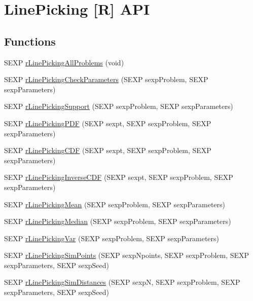 \hypertarget{group__rapi}{\section{Line\-Picking \mbox{[}R\mbox{]} A\-P\-I}
\label{group__rapi}
}
\subsection*{Functions}
\begin{DoxyCompactItemize}
\item 
S\-E\-X\-P \hyperlink{group__rapi_ga02145a395d24bbe929ffa57688c72ef5}{r\-Line\-Picking\-All\-Problems} (void)
\item 
S\-E\-X\-P \hyperlink{group__rapi_ga9b3ba58aca598b6ee8f7239e87f3076c}{r\-Line\-Picking\-Check\-Parameters} (S\-E\-X\-P sexp\-Problem, S\-E\-X\-P sexp\-Parameters)
\item 
S\-E\-X\-P \hyperlink{group__rapi_ga6b30fc1bdbca2a3cc7f5340f1d8b44d5}{r\-Line\-Picking\-Support} (S\-E\-X\-P sexp\-Problem, S\-E\-X\-P sexp\-Parameters)
\item 
S\-E\-X\-P \hyperlink{group__rapi_gafe4502dd2e61ac946bfe6543fb38dd39}{r\-Line\-Picking\-P\-D\-F} (S\-E\-X\-P sexpt, S\-E\-X\-P sexp\-Problem, S\-E\-X\-P sexp\-Parameters)
\item 
S\-E\-X\-P \hyperlink{group__rapi_gac85aaf9284a29359e0d534ac1641b3f2}{r\-Line\-Picking\-C\-D\-F} (S\-E\-X\-P sexpt, S\-E\-X\-P sexp\-Problem, S\-E\-X\-P sexp\-Parameters)
\item 
S\-E\-X\-P \hyperlink{group__rapi_ga853c8dab80e2bdd284dba4f5e957811a}{r\-Line\-Picking\-Inverse\-C\-D\-F} (S\-E\-X\-P sexpt, S\-E\-X\-P sexp\-Problem, S\-E\-X\-P sexp\-Parameters)
\item 
S\-E\-X\-P \hyperlink{group__rapi_ga4316d34063551a4121f4cc0b7959b166}{r\-Line\-Picking\-Mean} (S\-E\-X\-P sexp\-Problem, S\-E\-X\-P sexp\-Parameters)
\item 
S\-E\-X\-P \hyperlink{group__rapi_gab5df1a048f574d55cfa6d609fd33d436}{r\-Line\-Picking\-Median} (S\-E\-X\-P sexp\-Problem, S\-E\-X\-P sexp\-Parameters)
\item 
S\-E\-X\-P \hyperlink{group__rapi_gac2d2e36336e7c32427a9e99ccc67d18e}{r\-Line\-Picking\-Var} (S\-E\-X\-P sexp\-Problem, S\-E\-X\-P sexp\-Parameters)
\item 
S\-E\-X\-P \hyperlink{group__rapi_gacf32b79fce86f86cedc7843775e163c3}{r\-Line\-Picking\-Sim\-Points} (S\-E\-X\-P sexp\-Npoints, S\-E\-X\-P sexp\-Problem, S\-E\-X\-P sexp\-Parameters, S\-E\-X\-P sexp\-Seed)
\item 
S\-E\-X\-P \hyperlink{group__rapi_ga1d8792844b8fb2bfe583d80d7580938d}{r\-Line\-Picking\-Sim\-Distances} (S\-E\-X\-P sexp\-N, S\-E\-X\-P sexp\-Problem, S\-E\-X\-P sexp\-Parameters, S\-E\-X\-P sexp\-Seed)
\end{DoxyCompactItemize}


